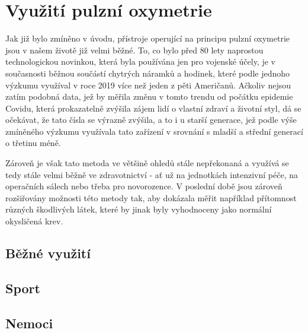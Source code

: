 \section {Využití pulzní oxymetrie}
Jak již bylo zmíněno v úvodu, přístroje operující na principu pulzní oxymetrie jsou v našem životě již velmi běžné. To, co bylo před 80 lety naprostou technologickou novinkou, která byla používána jen pro vojenské účely, je v současnosti běžnou součástí chytrých náramků a hodinek, které podle jednoho výzkumu \citep{wearables} využíval v roce 2019 více než jeden z pěti Američanů. Ačkoliv nejsou zatím podobná data, jež by měřila změnu v tomto trendu od počátku epidemie Covidu, která prokazatelně zvýšila zájem lidí o vlastní zdraví a životní styl, dá se očekávat, že tato čísla se výrazně zvýšila, a to i u starší generace, jež podle výše zmíněného výzkumu využívala tato zařízení v srovnání s mladší a střední generací o třetinu méně.
\par Zároveň je však tato metoda ve většině ohledů stále nepřekonaná a využívá se tedy stále velmi běžně ve zdravotnictví - ať už na jednotkách intenzivní péče, na operačních sálech nebo třeba pro novorozence. V poslední době jsou zároveň rozšiřovány možnosti této metody tak, aby dokázala měřit například přítomnost různých škodlivých látek, které by jinak byly vyhodnoceny jako normální okysličená krev.
\subsection {Běžné využití}
\subsection {Sport}
\subsection {Nemoci}
